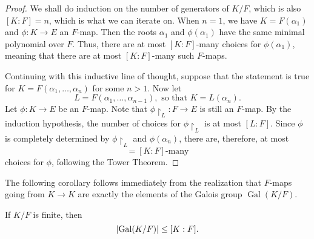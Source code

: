 \documentclass[notoc,notitlepage,nobib]{tufte-book}
\DeclareMathOperator{\Gal}{Gal}
\begin{document}
\begin{proof}
  We shall do induction on the number of generators of $K / F$, which is also
  $[ K : F ] = n$, which is what we can iterate on. When $n = 1$, we have $K =
  F(\alpha_1)$ and $\phi : K \to E$ an $F$-map. Then the roots $\alpha_1$ and
  $\phi(\alpha_1)$ have the same minimal polynomial 
  over $F$. Thus, there are at most $[ K : F ]$-many choices for
  $\phi(\alpha_1)$, meaning that there are at most $[ K : F ]$-many such
  $F$-maps.

  Continuing with this inductive line of thought, suppose that the statement is
  true for $K = F(\alpha_1, \ldots, \alpha_n)$ for some $n > 1$. Now let
  \begin{equation*}
    L = F(\alpha_1, \ldots, \alpha_{n - 1}), \text{ so that } K = L(\alpha_n).
  \end{equation*}
  Let $\phi : K \to E$ be an $F$-map. Note that $\phi \restriction_L : F \to E$
  is still an $F$-map. By the induction hypothesis, the number of choices for
  $\phi \restriction_L$ is at most $[ L : F ]$. Since $\phi$ is completely
  determined by $\phi \restriction_L$ and $\phi(\alpha_n)$, there are,
  therefore, at most
  \begin{equation*}
    [L : F][ L(\alpha_n) : L ] = [ K : F ]\text{-many}
  \end{equation*}
  choices for $\phi$, following the Tower Theorem.
\end{proof}

The following corollary follows immediately from the realization that $F$-maps
going from $K \to K$ are exactly the elements of the Galois group $\Gal(K / F)$.

\begin{crly}\label{crly:upper_bound_for_the_galois_group_of_finite_extensions}
  If $K / F$ is finite, then
  \begin{equation*}
    \abs{ \Gal(K / F) } \leq [ K : F ].
  \end{equation*}
\end{crly}
\end{document}
